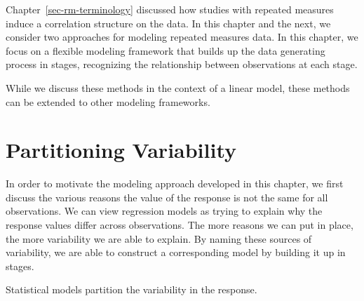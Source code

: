 \documentclass[
  letterpaper,
  DIV=11,
  numbers=noendperiod]{scrreprt}
\theoremstyle{definition}
\theoremstyle{definition}
\theoremstyle{remark}
\begin{document}
Chapter~\ref{sec-rm-terminology} discussed how studies with repeated
measures induce a correlation structure on the data. In this chapter and
the next, we consider two approaches for modeling repeated measures
data. In this chapter, we focus on a flexible modeling framework that
builds up the data generating process in stages, recognizing the
relationship between observations at each stage.

\begin{tcolorbox}[enhanced jigsaw, left=2mm, toprule=.15mm, arc=.35mm, breakable, opacitybacktitle=0.6, opacityback=0, rightrule=.15mm, colbacktitle=quarto-callout-note-color!10!white, coltitle=black, leftrule=.75mm, toptitle=1mm, colframe=quarto-callout-note-color-frame, titlerule=0mm, title=\textcolor{quarto-callout-note-color}{\faInfo}\hspace{0.5em}{Note}, bottomrule=.15mm, colback=white, bottomtitle=1mm]

While we discuss these methods in the context of a linear model, these
methods can be extended to other modeling frameworks.

\end{tcolorbox}

\hypertarget{partitioning-variability}{%
\section{Partitioning Variability}\label{partitioning-variability}}

In order to motivate the modeling approach developed in this chapter, we
first discuss the various reasons the value of the response is not the
same for all observations. We can view regression models as trying to
explain why the response values differ across observations. The more
reasons we can put in place, the more variability we are able to
explain. By naming these sources of variability, we are able to
construct a corresponding model by building it up in stages.

\begin{tcolorbox}[enhanced jigsaw, left=2mm, toprule=.15mm, arc=.35mm, breakable, opacitybacktitle=0.6, opacityback=0, rightrule=.15mm, colbacktitle=quarto-callout-tip-color!10!white, coltitle=black, leftrule=.75mm, toptitle=1mm, colframe=quarto-callout-tip-color-frame, titlerule=0mm, title=\textcolor{quarto-callout-tip-color}{\faLightbulb}\hspace{0.5em}{Big Idea}, bottomrule=.15mm, colback=white, bottomtitle=1mm]

Statistical models partition the variability in the response.

\end{tcolorbox}
\end{document}
